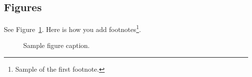 \documentclass{article}
\begin{document}
\subsection{Figures}

See Figure~\ref{fig:fig1}. Here is how you add footnotes\footnote{Sample of the first footnote.}.

\begin{figure}
	\centering
	\fbox{\rule[-.5cm]{4cm}{4cm} \rule[-.5cm]{4cm}{0cm}}
	\caption{Sample figure caption.}
	\label{fig:fig1}
\end{figure}











\end{document}
